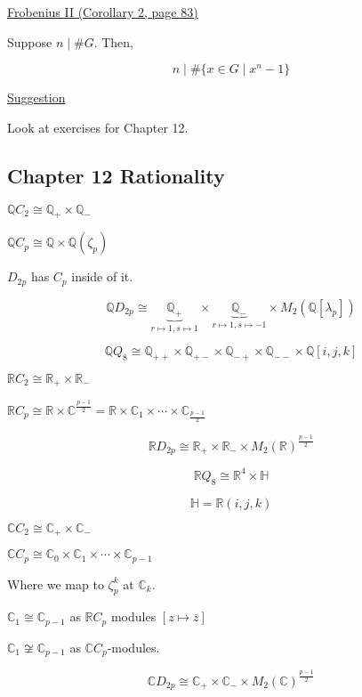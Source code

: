 \documentclass{article}
\theoremstyle{definition}
\begin{document}
\underline{Frobenius II (Corollary 2, page 83)}

Suppose \(n\mid \#G\). Then,

\[
    n \mid \#\{ x\in G \mid x^n - 1 \}
\]

\underline{Suggestion} 

Look at exercises for Chapter 12.

\subsection*{Chapter 12 Rationality}

\(\mathbb{Q} C_2 \cong \mathbb{Q}_+ \times \mathbb{Q}_-\)

\(\mathbb{Q} C_p \cong \mathbb{Q} \times \mathbb{Q}(\zeta_p)\)

\(D_{2p}\) has \(C_p\) inside of it.

\[
    \mathbb{Q} D_{2p} \cong \underbrace{\mathbb{Q}_+}_{r \mapsto 1, s \mapsto 1} \times \underbrace{\mathbb{Q}_-}_{r \mapsto 1, s \mapsto -1} \times M_2(\mathbb{Q}[\lambda_p])
\]

\[
    \mathbb{Q} Q_8 \cong \mathbb{Q}_{++} \times \mathbb{Q}_{+-} \times \mathbb{Q}_{-+} \times \mathbb{Q}_{--} \times \mathbb{Q}[i,j,k]
\]

\(\mathbb{R} C_2 \cong \mathbb{R}_+ \times \mathbb{R}_-\) 

\(\mathbb{R} C_p \cong \mathbb{R} \times \mathbb{C}^{\frac{p-1}{2}} = \mathbb{R} \times \mathbb{C}_1 \times \cdots \times \mathbb{C}_{\frac{p-1}{2}}\) 

\[
    \mathbb{R} D_{2p} \cong \mathbb{R}_+ \times \mathbb{R}_- \times M_2(\mathbb{R})^{\frac{p-1}{2}}
\]

\[
    \mathbb{R} Q_8 \cong \mathbb{R}^4 \times \mathbb{H}
\]

\[
    \mathbb{H} = \mathbb{R}(i,j,k)
\]

\(\mathbb{C} C_2 \cong \mathbb{C}_+ \times \mathbb{C}_-\) 

\(\mathbb{C} C_p \cong \mathbb{C}_0 \times \mathbb{C}_1 \times \cdots \times \mathbb{C}_{p-1}\)

Where we map to \(\zeta_p^k\) at \(\mathbb{C}_k\). 

\(\mathbb{C}_1 \cong \mathbb{C}_{p-1}\) as \(\mathbb{R} C_p\) modules \([z \mapsto \overline{z}]\)

\(\mathbb{C}_1 \not\cong \mathbb{C}_{p-1} \) as \(\mathbb{C} C_p\)-modules.

\[
    \mathbb{C} D_{2p} \cong \mathbb{C}_+ \times \mathbb{C}_- \times M_2(\mathbb{C})^{\frac{p-1}{2}}
\]
\end{document}
